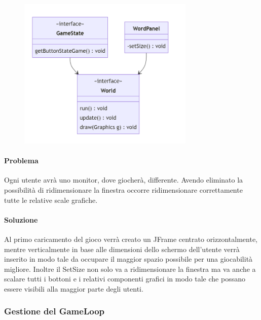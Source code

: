\documentclass[a4paper,12pt]{report}
\begin{document}
\begin{figure}[H]
    \centering{}
    \includegraphics[width=0.75\textwidth]{img/UMLFinestraDiGioco.png}
    \caption{}
\end{figure}

\paragraph{Problema} Ogni utente avrà uno monitor, dove giocherà, differente. Avendo eliminato la possibilità di ridimensionare la finestra occorre ridimensionare correttamente tutte le relative scale grafiche.

\paragraph{Soluzione} Al primo caricamento del gioco verrà creato un JFrame centrato orizzontalmente, mentre verticalmente in base alle dimensioni dello schermo dell’utente verrà inserito in modo tale da occupare il maggior spazio possibile per una giocabilità migliore. Inoltre il SetSize non solo va a ridimensionare la finestra ma va anche a scalare tutti i bottoni e i relativi componenti grafici in modo tale che possano essere visibili alla maggior parte degli utenti.

\subsubsection{Gestione del GameLoop}
\end{document}
